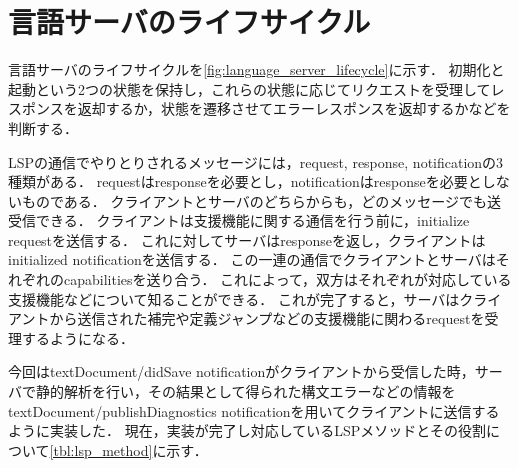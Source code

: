 \documentclass[fontsize=9bp,twocolumn,column_gap=2.36zw,a4paper,report]{jlreq}
\begin{document}
\begin{figure}[h]
\end{figure}

\section{言語サーバのライフサイクル}

言語サーバのライフサイクルを\ref{fig:language_server_lifecycle}に示す．
初期化と起動という2つの状態を保持し，これらの状態に応じてリクエストを受理してレスポンスを返却するか，状態を遷移させてエラーレスポンスを返却するかなどを判断する．\par
LSPの通信でやりとりされるメッセージには，request, response, notificationの3種類がある．
requestはresponseを必要とし，notificationはresponseを必要としないものである．
クライアントとサーバのどちらからも，どのメッセージでも送受信できる．
クライアントは支援機能に関する通信を行う前に，initialize requestを送信する．
これに対してサーバはresponseを返し，クライアントはinitialized notificationを送信する．
この一連の通信でクライアントとサーバはそれぞれのcapabilitiesを送り合う．
これによって，双方はそれぞれが対応している支援機能などについて知ることができる．
これが完了すると，サーバはクライアントから送信された補完や定義ジャンプなどの支援機能に関わるrequestを受理するようになる．\par
今回はtextDocument/didSave notificationがクライアントから受信した時，サーバで静的解析を行い，その結果として得られた構文エラーなどの情報をtextDocument/publishDiagnostics notificationを用いてクライアントに送信するように実装した．
現在，実装が完了し対応しているLSPメソッドとその役割について\ref{tbl:lsp_method}に示す．
\end{document}
